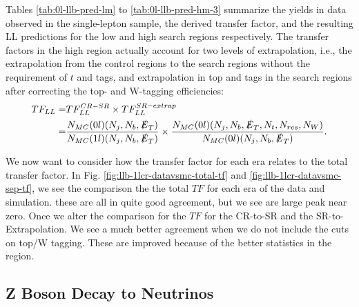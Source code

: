 Tables \ref{tab:0l-llb-pred-lm} to \ref{tab:0l-llb-pred-hm-3} summarize the yields in data observed in the single-lepton sample, the derived transfer factor, and the resulting LL predictions for the low \dm{} and high \dm{} search regions respectively. The transfer factors in the high \dm{} region actually account for two levels of extrapolation, i.e., the extrapolation from the control regions to the search regions without the requirement of $t$ and \W{} tags, and extrapolation in top and \W{} tags in the search regions after correcting the top- and W-tagging efficiencies:
\begin{equation}\label{TFExtrapolation}
\begin{split}
TF_{LL}=& TF_{LL}^{CR-SR}\times TF_{LL}^{SR-extrap} \\
=& \frac{N_{MC}(0l)(N_{j},N_{b},\slashed{E}_{T})}{N_{MC}(1l)(N_{j},N_{b},\slashed{E}_{T})}\times\frac{N_{MC}(0l)(N_{j},N_{b},\slashed{E}_{T},N_{t},N_{res},N_{W})}{N_{MC}(0l)(N_{j},N_{b},\slashed{E}_{T})}.
\end{split}
\end{equation}

We now want to consider how the transfer factor for each era relates to the total transfer factor. In Fig. \ref{fig:llb-1lcr-datavsmc-total-tf} and \ref{fig:llb-1lcr-datavsmc-sep-tf}, we see the comparison the the total $TF$ for each era of the data and simulation. these are all in quite good agreement, but we see are large peak near zero. Once we alter the comparison for the $TF$ for the CR-to-SR and the SR-to-Extrapolation. We see a much better agreement when we do not include the cuts on top/W tagging. These are improved because of the better statistics in the region. 






\subsection{Z Boson Decay to Neutrinos}
\label{subsec:Znunu}

